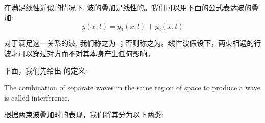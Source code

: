 \subsection[波的叠加]{}
在满足线性近似的情况下, 波的叠加是线性的。我们可以用下面的公式表达波的叠加:
\[y(x,t)=y_1(x,t)+y_2(x,t)\]

对于满足这一关系的波, 我们称之为 ；否则称之为\linebreak{}。线性波假设下，两束相遇的行波才可以穿过对方而不对其本身产生任何影响。

下面，我们先给出  的定义:
\begin{Itemize}
    \item The combination of separate waves in the same region of space to produce a  wave is called interference.
\end{Itemize}

根据两束波叠加时的表现，我们将其分为以下两类:

